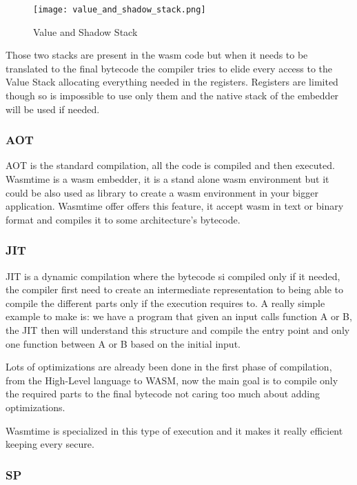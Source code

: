 \documentclass[../main.tex]{subfiles}
\begin{document}
\begin{figure}[h]
  \centering
  \texttt{[image: value\_and\_shadow\_stack.png]}
  \caption{Value and Shadow Stack}
  \label{fig:value-shadow-stack}
\end{figure}

Those two stacks are present in the wasm code but when it needs to be translated to the final bytecode the compiler tries to elide every access to the Value Stack allocating everything needed in the registers. Registers are limited though so is impossible to use only them and the native stack of the embedder will be used if needed.

\subsubsection{AOT}

AOT is the standard compilation, all the code is compiled and then executed. Wasmtime is a wasm embedder, it is a stand alone wasm environment but it could be also used as library to create a wasm environment in your bigger application. Wasmtime offer offers this feature, it accept wasm in text or binary format and compiles it to some architecture's bytecode.

\subsubsection{JIT}

JIT is a dynamic compilation where the bytecode si compiled only if it needed, the compiler first need to create an intermediate representation to being able to compile the different parts only if the execution requires to. A really simple example to make is: we have a program that given an input calls function A or B, the JIT then will understand this structure and compile the entry point and only one function between A or B based on the initial input.

Lots of optimizations are already been done in the first phase of compilation, from the High-Level language to WASM, now the main goal is to compile only the required parts to the final bytecode not caring too much about adding optimizations.

Wasmtime is specialized in this type of execution and it makes it really efficient keeping every secure.

\subsubsection{SP} %
\end{document}
